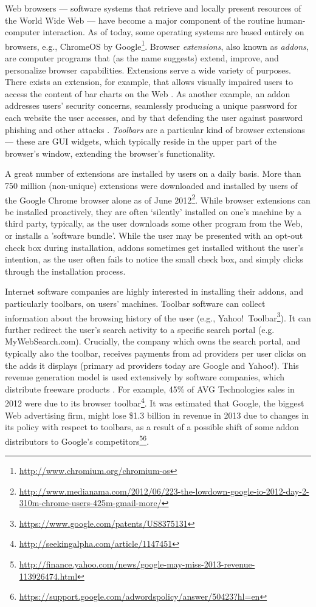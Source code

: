 \documentclass[ijoc,nonblindrev]{informs3} %
\numberwithin{equation}{subsection}
\begin{document}
Web browsers --- software systems that retrieve and locally present resources of the World Wide Web --- have become a major component of the routine human-computer interaction. As of today, some operating systems are based entirely on browsers, e.g., ChromeOS by Google\footnote{\url{http://www.chromium.org/chromium-os}}. Browser {\it extensions}, also known as {\it addons}, are computer programs that (as the name suggests) extend, improve, and personalize browser capabilities. Extensions serve a wide variety of purposes.
There exists an extension, for example, that allows visually impaired users to access the content of bar charts on the Web \citep{elzer2007browser}. As another example, an addon addresses users' security concerns, seamlessly producing a unique password for each website the user accesses, and by that defending the user against password phishing and other attacks \citep{ross2005stronger}. {\it Toolbars} are a particular kind of browser extensions --- these are GUI widgets, which typically reside in the upper part of the browser's window, extending the browser's functionality. 

A great number of extensions are installed by users on a daily basis. More than 750 million (non-unique) extensions were downloaded and installed by users of the Google Chrome browser alone as of June 2012\footnote{\url{http://www.medianama.com/2012/06/223-the-lowdown-google-io-2012-day-2-310m-chrome-users-425m-gmail-more/}}. While browser extensions can be installed proactively, they are often `silently' installed on one's machine by a third party, typically, as the user downloads some other program from the Web, or installs a 'software bundle'. While the user may be presented with an opt-out check box during installation, addons sometimes get installed without the user's intention, as the user often fails to notice the small check box, and simply clicks through the installation process.  

Internet software companies are highly interested in installing their addons, and particularly toolbars, on users' machines. Toolbar software can collect information about the browsing history of the user (e.g., Yahoo!~Toolbar\footnote{\url{https://www.google.com/patents/US8375131}}). It can further redirect the user's search activity to a specific search portal (e.g. MyWebSearch.com). Crucially, the company which owns the search portal, and typically also the toolbar, receives payments from ad providers per user clicks on the adds it displays (primary ad providers today are Google and Yahoo!). This revenue generation model is used extensively by software companies, which distribute freeware products \citep{leontiadis2012don}. For example, 45\% of AVG Technologies sales in 2012 were due to its browser toolbar\footnote{\url{http://seekingalpha.com/article/1147451}}.  It was estimated that Google, the biggest Web advertising firm, might lose \$1.3 billion in revenue in 2013 due to changes in its policy with respect to toolbars, as a result of a possible shift of some addon distributors to Google's competitors\footnote{\url{http://finance.yahoo.com/news/google-may-miss-2013-revenue-113926474.html}}\footnote{\url{https://support.google.com/adwordspolicy/answer/50423?hl=en}}.
\end{document}
